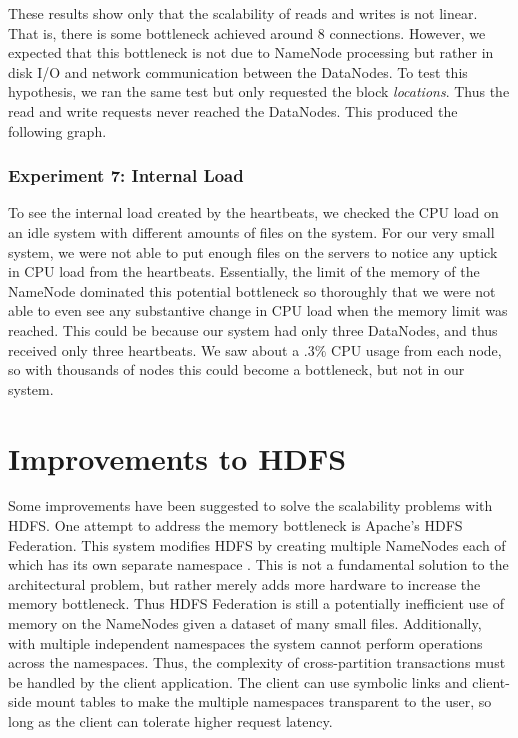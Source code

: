 \documentclass[11pt, a4paper]{article}
\begin{document}
\begin{multicols*}{2}
These results show only that the scalability of reads and writes is not linear. That is, there is some bottleneck achieved around 8 connections. However, we expected that this bottleneck is not due to NameNode processing but rather in disk I/O and network communication between the DataNodes. To test this hypothesis, we ran the same test but only requested the block \textit{locations}. Thus the read and write requests never reached the DataNodes. This produced the following graph.

\subsubsection{Experiment 7: Internal Load}\label{internal}
To see the internal load created by the heartbeats, we checked the CPU load on an idle system with different amounts of files on the system. For our very small system, we were not able to put enough files on the servers to notice any uptick in CPU load from the heartbeats. Essentially, the limit of the memory of the NameNode dominated this potential bottleneck so thoroughly that we were not able to even see any substantive change in CPU load when the memory limit was reached. This could be because our system had only three DataNodes, and thus received only three heartbeats. We saw about a $ .3\% $ CPU usage from each node, so with thousands of nodes this could become a bottleneck, but not in our system.

\section{Improvements to HDFS}\label{Improvements}

Some improvements have been suggested to solve the scalability problems with HDFS. One attempt to address the memory bottleneck is Apache's HDFS Federation. This system modifies HDFS by creating multiple NameNodes each of which has its own separate namespace \cite{Federation}. This is not a fundamental solution to the architectural problem, but rather merely adds more hardware to increase the memory bottleneck. Thus HDFS Federation is still a potentially inefficient use of memory on the NameNodes given a dataset of many small files. Additionally, with multiple independent namespaces the system cannot perform operations across the namespaces. Thus, the complexity of cross-partition transactions must be handled by the client application. The client can use symbolic links and client-side mount tables to make the multiple namespaces transparent to the user, so long as the client can tolerate higher request latency.


\end{multicols*}
\end{document}
